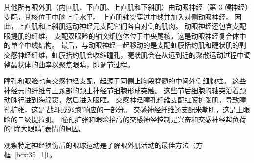其他所有眼外肌（内直肌、下直肌、上直肌和下斜肌）由动眼神经（第 3 颅神经）支配，其核位于中脑上丘水平。
上直肌轴突穿过中线并加入对侧动眼神经。
因此，上直肌和上斜肌运动神经元支配它们各自对侧的肌肉。
动眼神经还包含支配眼提肌的纤维。
支配双眼睑的轴突细胞体位于中央尾核，这是动眼神经复合体中的单个中线结构。
最后，与动眼神经一起移动的是支配虹膜括约肌和睫状肌的副交感神经纤维，虹膜括约肌会收缩瞳孔，睫状肌会在从远到近的聚散运动过程中调整晶状体的曲率以聚焦眼睛，即调节过程。


瞳孔和眼睑也有交感神经支配，起源于同侧上胸段脊髓的中间外侧细胞柱。
这些神经元的纤维与上颈部的颈上神经节细胞形成突触。
这些节后细胞的轴突沿着颈动脉行进到海绵窦，然后进入眼眶。
交感神经瞳孔纤维支配虹膜扩张肌，导致瞳孔扩张，这是‘战斗或逃跑’响应的一部分。
交感神经纤维还支配米勒肌，这是上眼睑的二级提拉肌。
瞳孔扩张和眼睑抬高的交感神经控制是兴奋和交感神经超负荷的“睁大眼睛”表情的原因。



观察特定神经损伤后的眼球运动是了解眼外肌活动的最佳方法（方框~\ref{box:35_1}）。


